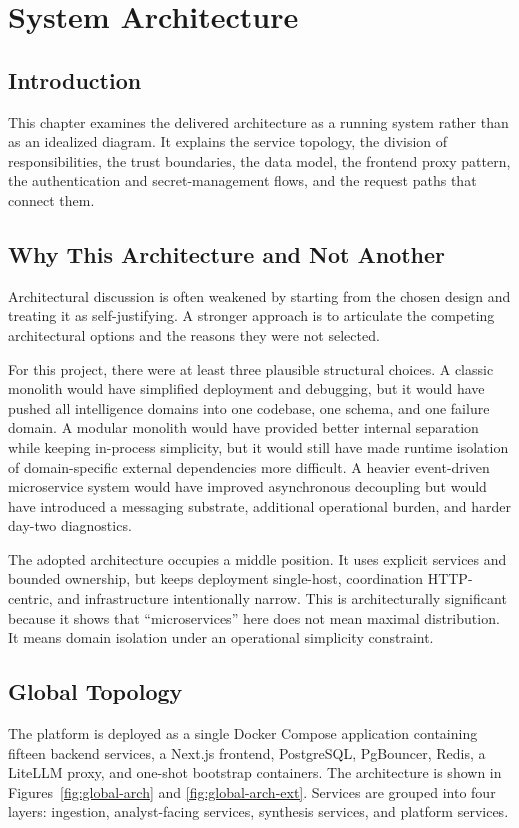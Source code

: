 \chapter{System Architecture}
\thispagestyle{plain}
\section*{Introduction}
This chapter examines the delivered architecture as a running system rather than as an idealized diagram. It explains the service topology, the division of responsibilities, the trust boundaries, the data model, the frontend proxy pattern, the authentication and secret-management flows, and the request paths that connect them.

\section{Why This Architecture and Not Another}
Architectural discussion is often weakened by starting from the chosen design and treating it as self-justifying. A stronger approach is to articulate the competing architectural options and the reasons they were not selected.

For this project, there were at least three plausible structural choices. A classic monolith would have simplified deployment and debugging, but it would have pushed all intelligence domains into one codebase, one schema, and one failure domain. A modular monolith would have provided better internal separation while keeping in-process simplicity, but it would still have made runtime isolation of domain-specific external dependencies more difficult. A heavier event-driven microservice system would have improved asynchronous decoupling but would have introduced a messaging substrate, additional operational burden, and harder day-two diagnostics.

The adopted architecture occupies a middle position. It uses explicit services and bounded ownership, but keeps deployment single-host, coordination HTTP-centric, and infrastructure intentionally narrow. This is architecturally significant because it shows that ``microservices'' here does not mean maximal distribution. It means domain isolation under an operational simplicity constraint.

\section{Global Topology}
The platform is deployed as a single Docker Compose application containing fifteen backend services, a Next.js frontend, PostgreSQL, PgBouncer, Redis, a LiteLLM proxy, and one-shot bootstrap containers. The architecture is shown in Figures~\ref{fig:global-arch} and \ref{fig:global-arch-ext}. Services are grouped into four layers: ingestion, analyst-facing services, synthesis services, and platform services.

